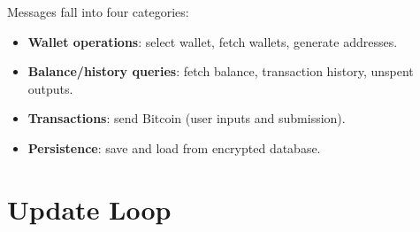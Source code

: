 Messages fall into four categories:

\begin{itemize}
  \item \textbf{Wallet operations}: select wallet, fetch wallets, generate addresses.
  \item \textbf{Balance/history queries}: fetch balance, transaction history, unspent outputs.
  \item \textbf{Transactions}: send Bitcoin (user inputs and submission).
  \item \textbf{Persistence}: save and load from encrypted database.
\end{itemize}

\section{Update Loop}
\label{sec:ch18-update}

